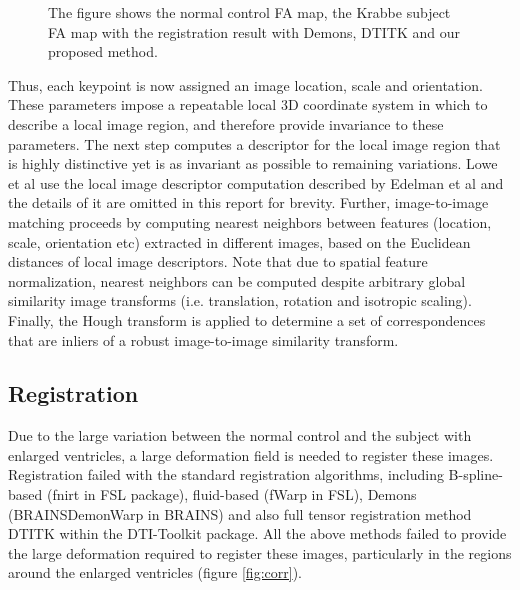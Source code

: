 \documentclass{llncs}
\begin{document}
\begin{figure}
    \label{fig:regMatch}
    \caption{The figure shows the normal control FA map, the Krabbe subject FA map with the registration result with Demons, DTITK and our proposed method.}
\end{figure}

Thus, each keypoint is now assigned an image location, scale and orientation. These parameters impose a repeatable local 3D coordinate system in which to describe a local image region, and therefore provide invariance to these parameters. The next step computes a descriptor for the local image region that is highly distinctive yet is as invariant as possible to remaining variations. Lowe et al \cite{Lowe:04} use the local image descriptor computation described by Edelman et al \cite{Edelman97} and the details of it are omitted in this report for brevity. Further, image-to-image matching proceeds by computing nearest neighbors between features (location, scale, orientation etc) extracted in different images, based on the Euclidean distances of local image descriptors. Note that due to spatial feature normalization, nearest neighbors can be computed despite arbitrary global similarity image transforms (i.e. translation, rotation and isotropic scaling). Finally, the Hough transform is applied to determine a set of correspondences that are inliers of a robust image-to-image similarity transform.

\subsection{Registration}
\label{subsec:registration}

Due to the large variation between the normal control and the subject with enlarged ventricles, a large deformation field is needed to register these images. Registration failed with the standard registration algorithms, including B-spline-based (fnirt in FSL package), fluid-based (fWarp in FSL), Demons (BRAINSDemonWarp in BRAINS) and also full tensor registration method DTITK within the DTI-Toolkit package. All the above methods failed to provide the large deformation required to register these images, particularly in the regions around the enlarged ventricles (figure \ref{fig:corr}).
\end{document}

